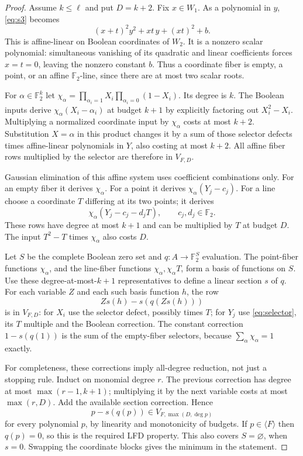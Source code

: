 \documentclass[11pt]{article}
\theoremstyle{remark}\newtheorem{remark}[theorem]{Remark}
\newcommand{\F}{\mathbb F}
\newcommand{\Id}{\langle F\rangle}
\begin{document}
\begin{proof}
Assume $k\le\ell$ and put $D=k+2$. Fix $x\in W_1$. As a polynomial in
$y$, \eqref{eq:s3} becomes
\begin{equation}\label{eq:fiber}
 (x+t)^2y^2+xt\,y+(xt)^2+b.
\end{equation}
This is affine-linear on Boolean coordinates of $W_2$. It is a nonzero
scalar polynomial: simultaneous vanishing of its quadratic and linear
coefficients forces $x=t=0$, leaving the nonzero constant $b$. Thus a
coordinate fiber is empty, a point, or an affine $\F_2$-line, since there
are at most two scalar roots.

For $\alpha\in\F_2^k$ let
$\chi_\alpha=\prod_{\alpha_i=1}X_i
                \prod_{\alpha_i=0}(1-X_i)$.
Its degree is $k$. The Boolean inputs derive
$\chi_\alpha(X_i-\alpha_i)$ at budget $k+1$ by explicitly factoring out
$X_i^2-X_i$. Multiplying a normalized coordinate input by $\chi_\alpha$
costs at most $k+2$. Substitution $X=\alpha$ in this product changes it by
a sum of those selector defects times affine-linear polynomials in $Y$,
also costing at most $k+2$. All affine fiber rows multiplied by the selector
are therefore in $V_{F,D}$.

Gaussian elimination of this affine system uses coefficient combinations
only. For an empty fiber it derives $\chi_\alpha$. For a point it derives
$\chi_\alpha(Y_j-c_j)$. For a line choose a coordinate $T$ differing at
its two points; it derives
\begin{equation}\label{eq:selector}
       \chi_\alpha(Y_j-c_j-d_jT),\qquad c_j,d_j\in\F_2.
\end{equation}
These rows have degree at most $k+1$ and can be multiplied by $T$ at
budget $D$. The input $T^2-T$ times $\chi_\alpha$ also costs $D$.

Let $S$ be the complete Boolean zero set and $q:A\to\F_2^S$ evaluation.
The point-fiber functions $\chi_\alpha$, and the line-fiber functions
$\chi_\alpha,\chi_\alpha T$, form a basis of functions on $S$.
Use these degree-at-most-$k+1$ representatives to define a linear section
$s$ of $q$. For each variable $Z$ and each such basis function $h$, the row
\[
       Zs(h)-s(q(Zs(h)))
\]
is in $V_{F,D}$: for $X_i$ use the selector defect, possibly times $T$;
for $Y_j$ use \eqref{eq:selector}, its $T$ multiple and the Boolean
correction. The constant correction $1-s(q(1))$ is the sum of the
empty-fiber selectors, because $\sum_\alpha\chi_\alpha=1$ exactly.

For completeness, these corrections imply all-degree reduction, not just
a stopping rule. Induct on monomial degree $r$. The previous correction
has degree at most $\max(r-1,k+1)$; multiplying it by the next variable
costs at most $\max(r,D)$. Add the available section correction. Hence
\[
       p-s(q(p))\in V_{F,\max(D,\deg p)}
\]
for every polynomial $p$, by linearity and monotonicity of budgets. If
$p\in\Id$ then $q(p)=0$, so this is the required LFD property.
This also covers $S=\varnothing$, when $s=0$. Swapping the coordinate
blocks gives the minimum in the statement.
\end{proof}
\end{document}
